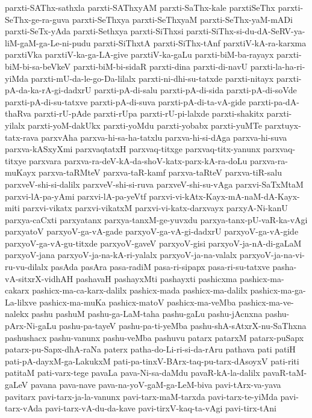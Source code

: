 {parxti-SAThx-sathxla
parxti-SAThxyAM
parxti-SaThx-kale
parxtiSeThx
parxti-SeThx-ge-ra-guva
parxti-SeThxya
parxti-SeThxyaM
parxti-SeThx-yaM-mADi
parxti-SeTx-yAda
parxti-Sethxya
parxti-SiThxsi
parxti-SiThx-si-du-dA-SeRV-ya-liM-gaM-ga-Le-ni-pudu
parxti-SiThxtA
parxti-SiThx-tAnf
parxtiV-kA-ra-karxma
parxtiVka
parxtiV-ka-ga-LA-give
parxtiV-ka-gaLu
parxti-biM-ba-rayayx
parxti-biM-bi-sa-beVkeV
parxti-biM-bi-sidaR
parxti-dina
parxti-di-navU
parxti-la-ha-ri-yiMda
parxti-mU-da-le-go-Da-lilalx
parxti-ni-dhi-su-tatxde
parxti-nitayx
parxti-pA-da-ka-rA-gi-dadxrU
parxti-pA-di-salu
parxti-pA-di-sida
parxti-pA-di-soVde
parxti-pA-di-su-tatxve
parxti-pA-di-suva
parxti-pA-di-ta-vA-gide
parxti-pa-dA-thaRva
parxti-rU-pAde
parxti-rUpa
parxti-rU-pi-lalxde
parxti-shakitx
parxti-yilalx
parxti-yoM-dakUkx
parxti-yoMdu
parxti-yobabx
parxti-yuMTe
parxtuyx-tatx-rava
parxvAha
parxva-hi-sa-ha-tatxlu
parxva-hi-si-dAga
parxva-hi-suva
parxva-kASxyXmi
parxvaqtatxH
parxvaq-titxge
parxvaq-titx-yanunx
parxvaq-titxye
parxvara
parxva-ra-deV-kA-da-shoV-katx-parx-kA-ra-doLu
parxva-ra-muKayx
parxva-taRMteV
parxva-taR-kamf
parxva-taRteV
parxva-tiR-salu
parxveV-shi-si-dalilx
parxveV-shi-si-ruva
parxveV-shi-su-vAga
parxvi-SaTxMtaM
parxvi-lA-pa-yAmi
parxvi-lA-pa-yeVtf
parxvi-vi-kAtx-Kayx-mA-naM-dA-Kayx-miti
parxvi-vikatx
parxvi-vikatxM
parxvi-vi-katx-darxvayx
parxyA-Ni-kanU
parxya-caCxti
parxyatanx
parxya-tanxM-ge-yuvxdu
parxya-tanx-pU-vaR-ka-vAgi
parxyatoV
parxyoV-ga-vA-gade
parxyoV-ga-vA-gi-dadxrU
parxyoV-ga-vA-gide
parxyoV-ga-vA-gu-titxde
parxyoV-gaveV
parxyoV-gisi
parxyoV-ja-nA-di-gaLaM
parxyoV-jana
parxyoV-ja-na-kA-ri-yalalx
parxyoV-ja-na-valalx
parxyoV-ja-na-vi-ru-vu-dilalx
pasAda
pasAra
pasa-radiM
pasa-ri-sipapx
pasa-ri-su-tatxve
pasha-vA-sitxrX-vidhAH
pashavaH
pashayxMti
pashayxti
pashicxma
pashicx-ma-cakarx
pashicx-ma-ca-karx-dalilx
pashicx-mada
pashicx-ma-dalilx
pashicx-ma-ga-La-lilxve
pashicx-ma-muKa
pashicx-matoV
pashicx-ma-veMba
pashicx-ma-ve-nalekx
pashu
pashuM
pashu-ga-LaM-taha
pashu-gaLu
pashu-jAcnxna
pashu-pArx-Ni-gaLu
pashu-pa-tayeV
pashu-pa-ti-yeMba
pashu-shA-sAtxrX-nu-SaThxna
pashushacx
pashu-vanunx
pashu-veMba
pashuvu
patarx
patarxM
patarx-puSapx
patarx-pu-Sapx-dhA-raNa
paterx
patha-do-Li-ri-si-da-rAru
pathava
pati
patiH
pati-pA-dayxM-ga-LakukxM
pati-pa-tinxV-BArx-taq-pu-tarx-dAsoyxV
pati-riti
patitaM
pati-varx-tege
pavaLa
pava-Ni-sa-daMdu
pavaR-kA-la-dalilx
pavaR-taM-gaLeV
pavana
pava-nave
pava-na-yoV-gaM-ga-LeM-biva
pavi-tArx-va-yava
pavitarx
pavi-tarx-ja-la-vanunx
pavi-tarx-maM-tarxda
pavi-tarx-te-yiMda
pavi-tarx-vAda
pavi-tarx-vA-du-da-kave
pavi-tirxV-kaq-ta-vAgi
pavi-tirx-tAni
}
